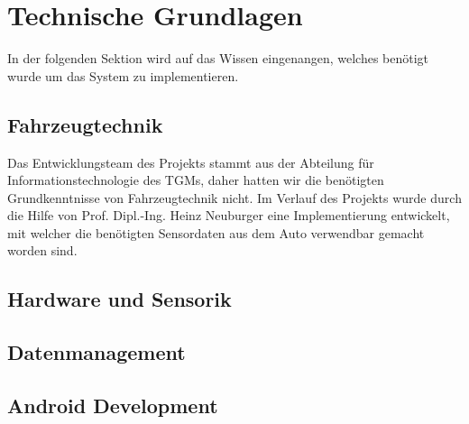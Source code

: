 \section{Technische Grundlagen}
\label{sec:techngrund}

In der folgenden Sektion wird auf das Wissen eingenangen, welches benötigt wurde um das System zu implementieren. 

\subsection{Fahrzeugtechnik}
Das Entwicklungsteam des Projekts stammt aus der Abteilung für Informationstechnologie des TGMs, daher hatten wir die benötigten Grundkenntnisse von Fahrzeugtechnik nicht. Im Verlauf des Projekts wurde durch die Hilfe von Prof. Dipl.-Ing. Heinz Neuburger eine Implementierung entwickelt, mit welcher die benötigten Sensordaten aus dem Auto verwendbar gemacht worden sind.



\subsection{Hardware und Sensorik}






\subsection{Datenmanagement}





\subsection{Android Development}


